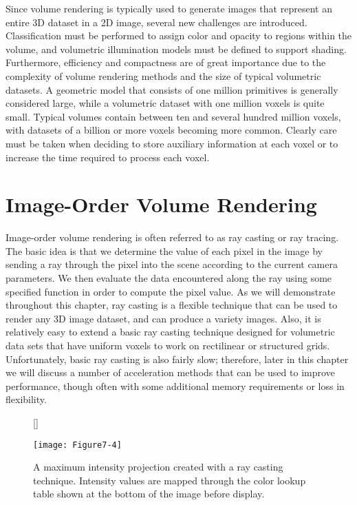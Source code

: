 Since volume rendering is typically used to generate images that represent an entire 3D dataset in a 2D image, several new challenges are introduced. Classification must be performed to assign color and opacity to regions within the volume, and volumetric illumination models must be defined to support shading. Furthermore, efficiency and compactness are of great importance due to the complexity of volume rendering methods and the size of typical volumetric datasets. A geometric model that consists of one million primitives is generally considered large, while a volumetric dataset with one million voxels is quite small. Typical volumes contain between ten and several hundred million voxels, with datasets of a billion or more voxels becoming more common. Clearly care must be taken when deciding to store auxiliary information at each voxel or to increase the time required to process each voxel.

\section{Image-Order Volume Rendering}

Image-order volume rendering is often referred to as ray casting or ray tracing. The basic idea is that we determine the value of each pixel in the image by sending a ray through the pixel into the scene according to the current camera parameters. We then evaluate the data encountered along the ray using some specified function in order to compute the pixel value. As we will demonstrate throughout this chapter, ray casting is a flexible technique that can be used to render any 3D image dataset, and can produce a variety images. Also, it is relatively easy to extend a basic ray casting technique designed for volumetric data sets that have uniform voxels to work on rectilinear or structured grids. Unfortunately, basic ray casting is also fairly slow; therefore, later in this chapter we will discuss a number of acceleration methods that can be used to improve performance, though often with some additional memory requirements or loss in flexibility.

\begin{figure}[!htb]
	[\FBwidth]
	{\caption{A maximum intensity projection created with a ray casting technique. Intensity values are mapped through the color lookup table shown at the bottom of the image before display.}\label{fig:Figure7-4}}
	{\texttt{[image: Figure7-4]}}
\end{figure}


